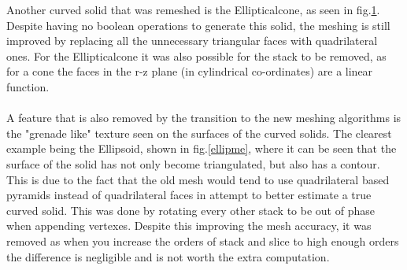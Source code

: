 \documentclass[12pt,a4paper]{article}
\begin{document}
\begin{figure}[h!]
\begin{minipage}{.4\textwidth}
  \label{elco1}
\end{minipage}%
\end{figure}

\noindent Another curved solid that was remeshed is the Ellipticalcone, as seen in fig.\ref{elco1}. Despite having no boolean operations to generate this solid, the meshing is still improved by replacing all the unnecessary triangular faces with quadrilateral ones. For the Ellipticalcone it was also possible for the stack to be removed, as for a cone the faces in the r-z plane (in cylindrical co-ordinates) are a linear function.
\\\\
\noindent A feature that is also removed by the transition to the new meshing algorithms is the "grenade like" texture seen on the surfaces of the curved solids. The clearest example being the Ellipsoid, shown in fig.\ref{ellipme}, where it can be seen that the surface of the solid has not only become triangulated, but also has a contour. This is due to the fact that the old mesh would tend to use quadrilateral based pyramids instead of quadrilateral faces in attempt to better estimate a true curved solid. This was done by rotating every other stack to be out of phase when appending vertexes. Despite this improving the mesh accuracy, it was removed as when you increase the orders of stack and slice to high enough orders the difference is negligible and is not worth the extra computation.  
\end{document}
